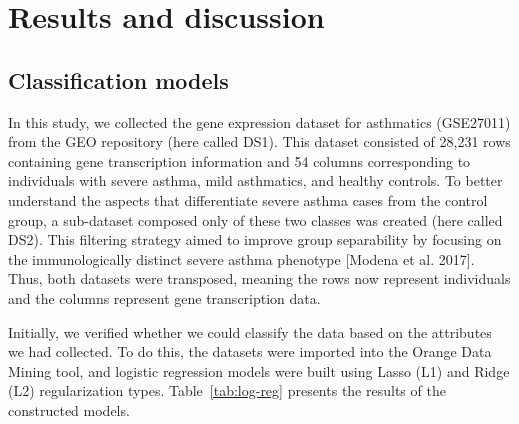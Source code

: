 \section{Results and discussion} %

\subsection{Classification models} %

In this study, we collected the gene expression dataset for asthmatics (GSE27011) from the GEO repository (here called DS1). This dataset consisted of 28,231 rows containing gene transcription information and 54 columns corresponding to individuals with severe asthma, mild asthmatics, and healthy controls. To better understand the aspects that differentiate severe asthma cases from the control group, a sub-dataset composed only of these two classes was created (here called DS2). This filtering strategy aimed to improve group separability by focusing on the immunologically distinct severe asthma phenotype [Modena et al. 2017]. Thus, both datasets were transposed, meaning the rows now represent individuals and the columns represent gene transcription data.

Initially, we verified whether we could classify the data based on the attributes we had collected. To do this, the datasets were imported into the Orange Data Mining tool, and logistic regression models were built using Lasso (L1) and Ridge (L2) regularization types. Table~\ref{tab:log-reg} presents the results of the constructed models.

